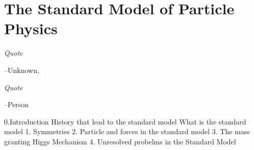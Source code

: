 \chapter{The Standard Model of Particle Physics}

	


\epigraph{\textit{Quote}}{--Unknown, \textit{}}
\epigraph{\textit{Quote}}{--Person}

0.Introduction 
    History that lead to the standard model
    What is the standard model 
1. Symmetries
2. Particle and forces in the standard model
3. The mass granting Higgs Mechanism 
4. Unresolved probelms in the Standard Model


